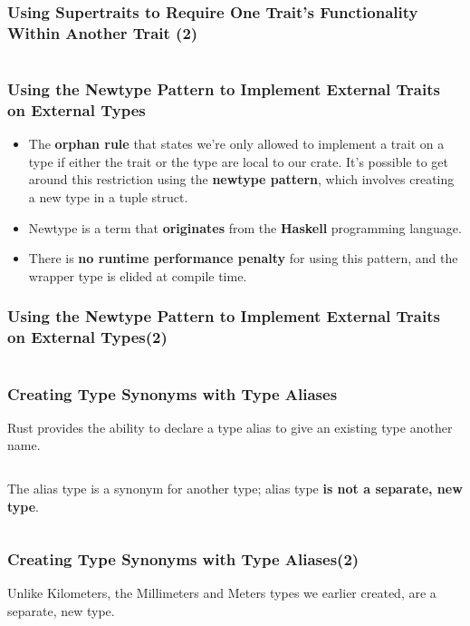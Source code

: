 \documentclass{beamer}
\begin{document}
\begin{frame}[fragile]
	\frametitle{Using Supertraits to Require One Trait’s Functionality Within Another Trait (2)}
	\inputminted[firstnumber=17]{rust}{./code/iter10.rs}
\end{frame}
	
	
	
	
	\begin{frame}[fragile]
		\frametitle{Using the Newtype Pattern to Implement External Traits on External Types}
		\begin{itemize}
			\item The \textbf{orphan rule} that states we’re only allowed to implement a trait on a type if either the trait or the type are local to our crate. It’s possible to get around this restriction using the \textbf{newtype pattern}, which involves creating a new type in a tuple struct. 
			\item 		 Newtype is a term that \textbf{originates} from the \textbf{Haskell} programming language. 
			\item 		 There is \textbf{no runtime performance penalty }for using this pattern, and the wrapper type is elided at compile time.
		\end{itemize}
	\end{frame}

\begin{frame}[fragile]
	\frametitle{Using the Newtype Pattern to Implement External Traits on External Types(2)}
	
	\inputminted{rust}{./code/iter11.rs}
\end{frame}



\begin{frame}[fragile]
	\frametitle{Creating Type Synonyms with Type Aliases}
	Rust provides the ability to declare a type alias to give an existing type another name.
	
	\inputminted{rust}{./code/type1.rs}
	
	The alias type is a synonym for another type;  alias type  \textbf{is not a separate, new type}.
	
	\inputminted{rust}{./code/type2.rs}
\end{frame}

\begin{frame}[fragile]
	\frametitle{Creating Type Synonyms with Type Aliases(2)}
	Unlike Kilometers, the Millimeters and Meters types we earlier created, are a separate, new type. 
	
	\inputminted[fontsize=\scriptsize]{rust}{./code/type3.rs}
\end{frame}
\end{document}
